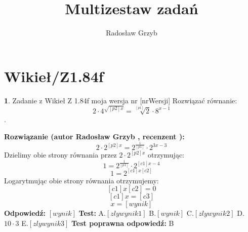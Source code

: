 \documentclass[12pt, a4paper]{article}
\title{Multizestaw zadań}
\author{Radosław Grzyb}
\date{}
\theoremstyle{definition} %
\newtheorem{zad}{}
\newcommand{\kategoria}[1]{\section{#1}} %
\newcommand{\zadStart}[1]{\begin{zad}#1\newline} %
\newcommand{\zadStop}{\end{zad}}   %
\newcommand{\rozwStart}[2]{\noindent \textbf{Rozwiązanie (autor #1 , recenzent #2): }\newline} %
\newcommand{\rozwStop}{\newline}                                            %
\newcommand{\odpStart}{\noindent \textbf{Odpowiedź:}\newline}    %
\newcommand{\odpStop}{\newline}                                             %
\newcommand{\testStart}{\noindent \textbf{Test:}\newline} %
\newcommand{\testStop}{\newline} %
\newcommand{\kluczStart}{\noindent \textbf{Test poprawna odpowiedź:}\newline} %
\newcommand{\kluczStop}{\newline} %
\begin{document}
\maketitle
\kategoria{Wikieł/Z1.84f}
\zadStart{Zadanie z Wikieł Z 1.84f moja wersja nr [nrWersji]}
Rozwiązać równanie:
$$2\cdot4^{\sqrt{[p2]x}}=\sqrt[[p1]]{2}\cdot8^{x-1}$$.
\zadStop
\rozwStart{Radosław Grzyb}{}
$$2\cdot2^{[p2]x}=2^{\frac{1}{[p1]}}\cdot2^{3x-3}$$
Dzielimy obie strony równania przez $2\cdot2^{[p2]x}$ otrzymując:
$$1=2^{\frac{1}{[p1]}}\cdot2^{[c1]x-4}$$
$$1=2^{[c1]x[c2]}$$
Logarytmując obie strony równania otrzymujemy:
$$[c1]x[c2]=0$$
$$[c1]x=[c3]$$
$$x=[wynik]$$
\rozwStop
\odpStart
$[wynik]$
\odpStop
\testStart
A.$[zlywynik1]$
B.$[wynik]$
C.$[zlywynik2]$
D.$10\cdot3$
E.$[zlywynik3]$
\testStop
\kluczStart
B
\kluczStop
\end{document}
